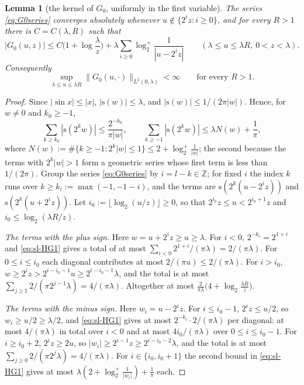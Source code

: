 \documentclass[11pt]{amsart}
\newtheorem{lemma}[theorem]{Lemma}
\theoremstyle{definition}
\theoremstyle{remark}
\newcommand{\Z}{\mathbb Z}
\begin{document}
\begin{lemma}[the kernel of $G_0$, uniformly in the first variable]\label{lem:sl-HG}
The series \eqref{eq:G0series} converges absolutely whenever $u\notin\{2^iz:i\ge0\}$, and for every $R>1$ there is
$C=C(\lambda,R)$ such that
\[
|G_0(u,z)|\le C\Big(1+\log\frac\lambda z\Big)+\lambda\sum_{i\ge0}\log_2^+\frac1{|u-2^iz|}
\qquad(\lambda\le u\le\lambda R,\ 0<z<\lambda).
\]
Consequently
\begin{equation}\label{eq:sl-HG}
\sup_{\lambda\le u\le\lambda R}\|G_0(u,\cdot)\|_{L^2(0,\lambda)}<\infty\qquad\text{for every }R>1 .
\end{equation}
\end{lemma}
\begin{proof}
Since $|\sin x|\le|x|$, $|\mathrm s(w)|\le\lambda$, and $|\mathrm s(w)|\le1/(2\pi|w|)$. Hence, for $w\ne0$ and $k_0\ge-1$,
\begin{equation}\label{eq:sl-HG1}
\sum_{k\ge k_0}|\mathrm s(2^kw)|\le\frac{2^{-k_0}}{\pi|w|},\qquad
\sum_{k\ge-1}|\mathrm s(2^kw)|\le\lambda N(w)+\frac1\pi,
\end{equation}
where $N(w):=\#\{k\ge-1:2^k|w|\le1\}\le2+\log_2^+\frac1{|w|}$; the second because the terms with $2^k|w|>1$ form a geometric series whose first term is less than $1/(2\pi)$.
Group the series \eqref{eq:G0series} by $i=l-k\in\Z$; for fixed $i$ the index $k$ runs over $k\ge k_i:=\max(-1,-1-i)$,
and the terms are $\mathrm s(2^k(u-2^iz))$ and $\mathrm s(2^k(u+2^iz))$. Let $i_0:=\lfloor\log_2(u/z)\rfloor\ge0$, so that
$2^{i_0}z\le u<2^{i_0+1}z$ and $i_0\le\log_2(\lambda R/z)$.

\emph{The terms with the plus sign.} Here $w=u+2^iz\ge u\ge\lambda$. For $i<0$, $2^{-k_i}=2^{1+i}$ and
\eqref{eq:sl-HG1} gives a total of at most $\sum_{i<0}2^{1+i}/(\pi\lambda)=2/(\pi\lambda)$. For $0\le i\le i_0$ each
diagonal contributes at most $2/(\pi u)\le2/(\pi\lambda)$. For $i>i_0$, $w\ge2^iz>2^{i-i_0-1}u\ge2^{i-i_0-1}\lambda$, and the
total is at most $\sum_{j\ge1}2/(\pi2^{j-1}\lambda)=4/(\pi\lambda)$. Altogether at most
$\frac2{\pi\lambda}\big(4+\log_2\frac{\lambda R}{z}\big)$.

\emph{The terms with the minus sign.} Here $w_i=u-2^iz$. For $i\le i_0-1$, $2^iz\le u/2$, so $w_i\ge u/2\ge\lambda/2$,
and \eqref{eq:sl-HG1} gives at most $2^{-k_i}\cdot2/(\pi\lambda)$ per diagonal: at most $4/(\pi\lambda)$ in total over
$i<0$ and at most $4i_0/(\pi\lambda)$ over $0\le i\le i_0-1$. For $i\ge i_0+2$, $2^iz\ge2u$, so
$|w_i|\ge2^{i-1}z\ge2^{i-i_0-2}\lambda$, and the total is at most $\sum_{j\ge0}2/(\pi2^j\lambda)=4/(\pi\lambda)$. For
$i\in\{i_0,i_0+1\}$ the second bound in \eqref{eq:sl-HG1} gives at most $\lambda(2+\log_2^+\frac1{|w_i|})+\frac1\pi$ each.


\end{proof}
\end{document}
